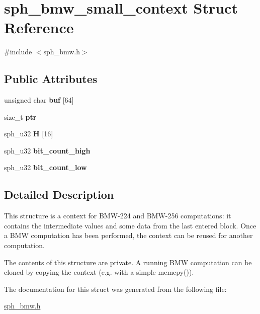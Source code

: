 \hypertarget{structsph__bmw__small__context}{}\section{sph\+\_\+bmw\+\_\+small\+\_\+context Struct Reference}
\label{structsph__bmw__small__context}


{\ttfamily \#include $<$sph\+\_\+bmw.\+h$>$}

\subsection*{Public Attributes}
\begin{DoxyCompactItemize}
\item 
\mbox{\label{structsph__bmw__small__context_a5f1580ed6522ddbb529017d3ba68e7b5}} 
unsigned char {\bfseries buf} \mbox{[}64\mbox{]}
\item 
\mbox{\label{structsph__bmw__small__context_ac3a10222d190e8421416d19330dc3629}} 
size\+\_\+t {\bfseries ptr}
\item 
\mbox{\label{structsph__bmw__small__context_a764567f1e5b6b3e8f9b14d87735ea4d8}} 
sph\+\_\+u32 {\bfseries H} \mbox{[}16\mbox{]}
\item 
\mbox{\label{structsph__bmw__small__context_a97ea70c252613bc1c1b41a862c8368ac}} 
sph\+\_\+u32 {\bfseries bit\+\_\+count\+\_\+high}
\item 
\mbox{\label{structsph__bmw__small__context_a1f4f38d96781dea1579d0e3320fa8968}} 
sph\+\_\+u32 {\bfseries bit\+\_\+count\+\_\+low}
\end{DoxyCompactItemize}


\subsection{Detailed Description}
This structure is a context for B\+M\+W-\/224 and B\+M\+W-\/256 computations\+: it contains the intermediate values and some data from the last entered block. Once a B\+MW computation has been performed, the context can be reused for another computation.

The contents of this structure are private. A running B\+MW computation can be cloned by copying the context (e.\+g. with a simple {\ttfamily memcpy()}). 

The documentation for this struct was generated from the following file\+:\begin{DoxyCompactItemize}
\item 
\mbox{\hyperlink{sph__bmw_8h}{sph\+\_\+bmw.\+h}}\end{DoxyCompactItemize}

